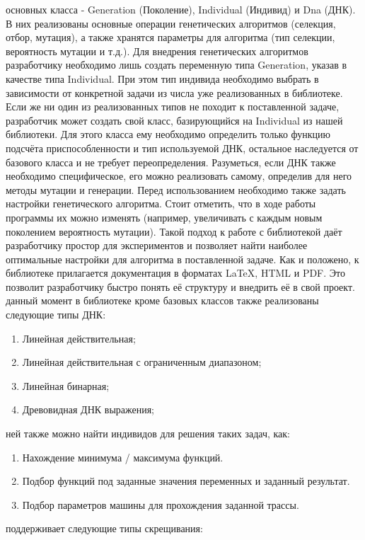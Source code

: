 \documentclass[a4paper, oneside, 11pt]{article}
\begin{document}
\indent{} основных класса -  Generation (Поколение), Individual (Индивид) и Dna (ДНК). В них реализованы основные операции генетических алгоритмов (селекция, отбор, мутация), а также хранятся параметры для алгоритма (тип селекции, вероятность мутации и т.д.). Для внедрения генетических алгоритмов разработчику необходимо лишь создать переменную типа Generation, указав в качестве типа Individual. При этом тип индивида необходимо выбрать в зависимости от конкретной задачи из числа уже реализованных в библиотеке. Если же ни один из реализованных типов не походит к поставленной задаче, разработчик может создать свой класс, базирующийся на Individual из нашей библиотеки. Для этого класса ему необходимо определить только функцию подсчёта приспособленности и тип используемой ДНК, остальное наследуется от базового класса и не требует переопределения. Разуметься, если ДНК также необходимо специфическое, его можно реализовать самому, определив для него методы мутации и генерации. Перед использованием необходимо также задать настройки генетического алгоритма. Стоит отметить, что в ходе работы программы их можно изменять (например, увеличивать с каждым новым поколением вероятность мутации). Такой подход к работе с библиотекой даёт разработчику простор для экспериментов и позволяет найти наиболее оптимальные настройки для алгоритма в поставленной задаче. Как и положено, к библиотеке прилагается документация в форматах LaTeX, HTML и PDF. Это позволит разработчику быстро понять её структуру и внедрить её в свой проект.
 данный момент в библиотеке кроме базовых классов также реализованы следующие типы ДНК:
\begin{enumerate}
\item Линейная действительная;
\item Линейная действительная с ограниченным диапазоном;
\item Линейная бинарная;
\item Древовидная ДНК выражения;
\end{enumerate}
 ней также можно найти индивидов для решения таких задач, как:
\begin{enumerate}
\item Нахождение минимума / максимума функций.
\item Подбор функций под заданные значения переменных и заданный результат.
\item Подбор параметров машины для прохождения заданной трассы.
\end{enumerate}
 поддерживает следующие типы скрещивания:
\end{document}
